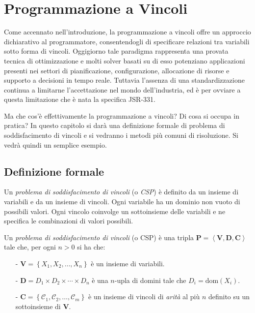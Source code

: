 \chapter{Programmazione a Vincoli}\label{capCP}
Come accennato nell'introduzione, la programmazione a vincoli offre un approccio
dichiarativo al programmatore, consentendogli di specificare relazioni tra 
variabili sotto forma di vincoli. Oggigiorno tale
paradigma rappresenta una provata tecnica di ottimizzazione e molti
solver basati su di esso potenziano applicazioni presenti nei settori di 
pianificazione,
configurazione, allocazione di risorse e supporto a decisioni in tempo reale.
Tuttavia l'assenza di una standardizzazione continua a limitarne l'accettazione
nel mondo dell'industria, ed è per ovviare a questa limitazione che è nata
la specifica JSR-331. 

Ma che cos'è effettivamente la programmazione a vincoli? Di cosa si occupa
in pratica? In questo capitolo si darà una definizione formale di problema di 
soddisfacimento di vincoli e si 
vedranno i metodi più comuni di risoluzione. Si vedrà quindi un semplice 
esempio.

\section{Definizione formale}
Un \emph{problema di soddisfacimento di vincoli} (o \emph{CSP}) è definito da un
insieme di variabili e da un insieme di vincoli. Ogni variabile ha un 
dominio non vuoto di possibili valori. Ogni vincolo coinvolge un sottoinsieme
delle variabili e ne specifica le combinazioni di valori possibili.

\begin{defi}
Un \emph{problema di soddisfacimento di vincoli} (o CSP) è una tripla 
$\mathbf{P} = \left\langle \mathbf{V}, \mathbf{D}, \mathbf{C}\right\rangle$
tale che, per ogni $n > 0$ si ha che:
\begin{itemize}
\item[-] $\mathbf{V} = \left\{ X_1, X_2, \ldots, X_n \right\}$ è un insieme
di variabili.
\item[-]$\mathbf{D} = D_1 \times D_2 \times \cdots \times D_n$ è una $n$-upla
di domini tale che $D_i = \textrm{dom}(X_i)$.
\item[-] $\mathbf{C} = \left\{ \mathcal{C}_1, \mathcal{C}_2, \ldots, 
\mathcal{C}_m \right\}$ è un insieme di vincoli di \emph{arità} al più
$n$ definito su un sottoinsieme di $\mathbf{V}$.
\end{itemize}
\end{defi}

